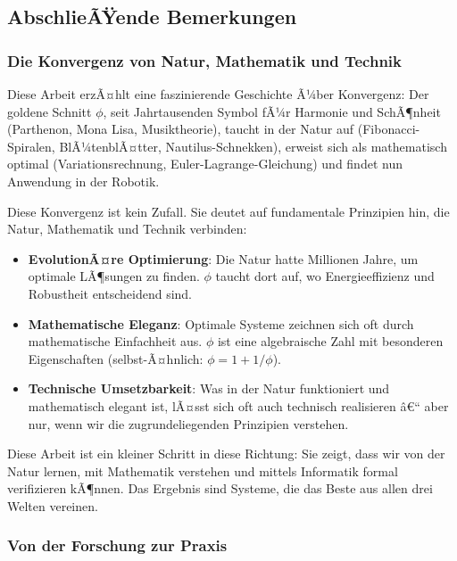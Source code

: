 ﻿\documentclass[a4paper,12pt]{article}
\theoremstyle{definition}
\begin{document}
\subsection{AbschlieÃŸende Bemerkungen}

\subsubsection{Die Konvergenz von Natur, Mathematik und Technik}

Diese Arbeit erzÃ¤hlt eine faszinierende Geschichte Ã¼ber Konvergenz: Der goldene Schnitt $\phi$, seit Jahrtausenden Symbol fÃ¼r Harmonie und SchÃ¶nheit (Parthenon, Mona Lisa, Musiktheorie), taucht in der Natur auf (Fibonacci-Spiralen, BlÃ¼tenblÃ¤tter, Nautilus-Schnek\-ken), erweist sich als mathematisch optimal (Variationsrechnung, Euler-Lagrange-Glei\-chung) und findet nun Anwendung in der Robotik.

Diese Konvergenz ist kein Zufall. Sie deutet auf fundamentale Prinzipien hin, die Natur, Mathematik und Technik verbinden:

\begin{itemize}
	\item \textbf{EvolutionÃ¤re Optimierung}: Die Natur hatte Millionen Jahre, um optimale LÃ¶\-sung\-en zu finden. $\phi$ taucht dort auf, wo Energieeffizienz und Robustheit entscheidend sind.
	
	\item \textbf{Mathematische Eleganz}: Optimale Systeme zeichnen sich oft durch mathematische Einfachheit aus. $\phi$ ist eine algebraische Zahl mit besonderen Eigenschaften (selbst-Ã¤hnlich: $\phi = 1 + 1/\phi$).
	
	\item \textbf{Technische Umsetzbarkeit}: Was in der Natur funktioniert und mathematisch elegant ist, lÃ¤sst sich oft auch technisch realisieren â€“ aber nur, wenn wir die zugrundeliegenden Prinzipien verstehen.
\end{itemize}

Diese Arbeit ist ein kleiner Schritt in diese Richtung: Sie zeigt, dass wir von der Natur lernen, mit Mathematik verstehen und mittels Informatik formal verifizieren kÃ¶nnen. Das Ergebnis sind Systeme, die das Beste aus allen drei Welten vereinen.

\subsubsection{Von der Forschung zur Praxis}
\end{document}
